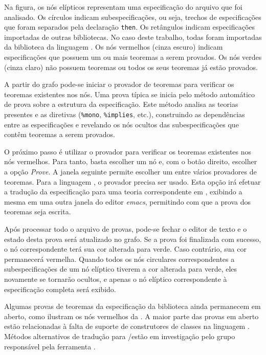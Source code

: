 Na figura, os nós elípticos representam uma especificação do arquivo que foi analisado.
Os círculos indicam subespecificações, ou seja, trechos de especificações que foram separados pela declaração \Verb.then..
Os retângulos indicam especificações importadas de outras bibliotecas.
No caso deste trabalho, todas foram importadas da biblioteca da linguagem \CASL.
Os nós vermelhos (cinza escuro) indicam especificações que possuem um ou mais teoremas a serem provados.
Os nós verdes (cinza claro) não possuem teoremas ou todos os seus teoremas já estão provados.

A partir do grafo pode-se iniciar o provador de teoremas \Isabelle para verificar os teoremas existentes nos nós. Uma prova típica se inicia pelo método automático de prova sobre a estrutura da especificação. Este método analisa as teorias presentes e as diretivas (\Verb.%mono., \Verb.%implies., etc.), construindo as dependências entre as especificações e revelando os nós ocultos das subespecificações que contêm teoremas a serem provados.

O próximo passo é utilizar o provador \Isabelle para verificar os teoremas existentes nos nós vermelhos. Para tanto, basta escolher um nó e, com o botão direito, escolher a opção \textit{Prove}. A janela seguinte permite escolher um entre vários provadores de teoremas. Para a linguagem \HasCASL, o provador \Isabelle precisa ser usado. Esta opção irá efetuar a tradução da especificação para uma teoria correspondente em \HOL, exibindo a mesma em uma outra janela do editor \textit{emacs}, permitindo com que a prova dos teoremas seja escrita.

Após processar todo o arquivo de provas, pode-se fechar o editor de texto e o estado desta prova será atualizado no grafo. Se a prova foi finalizada com sucesso, o nó correspondente terá sua cor alterada para verde. Caso contrário, sua cor permanecerá vermelha. Quando todos os nós circulares correspondentes a subespecificações de um nó elíptico tiverem a cor alterada para verde, eles novamente se tornarão ocultos, e apenas o nó elíptico correspondente à especificação completa será exibido.

Algumas provas de teoremas da especificação da biblioteca ainda permanecem em aberto, como ilustram os nós vermelhos da . A maior parte das provas em aberto estão relacionadas à falta de suporte de construtores de classes na linguagem \HOL. Métodos alternativos de tradução para \Isabelle/\HOL estão em investigação pelo grupo responsável pela ferramenta \Hets.

